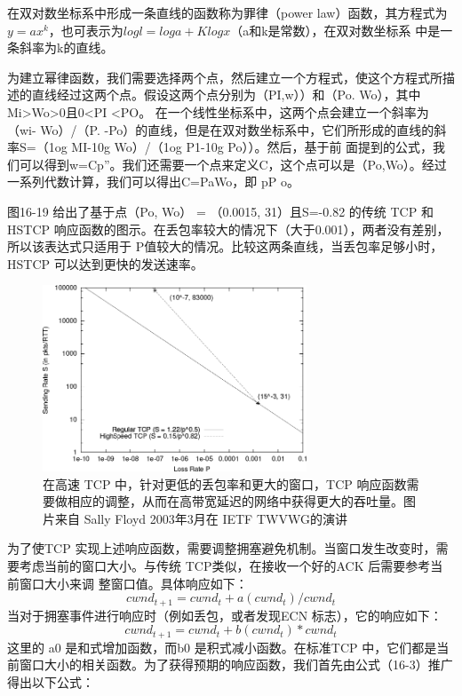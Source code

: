 \begin{tcolorbox}
    在双对数坐标系中形成一条直线的函数称为罪律（power law）函数，其方程式为$y=ax^{k}$，也可表示为$logl=loga+Klogx$（a和k是常数），在双对数坐标系
    中是一条斜率为k的直线。
\end{tcolorbox}

为建立幂律函数，我们需要选择两个点，然后建立一个方程式，使这个方程式所描述的直线经过这两个点。假设这两个点分别为（PI,w））和（Po. Wo），其中Mi>Wo>0且0<PI <PO。
在一个线性坐标系中，这两个点会建立一个斜率为（wi- Wo）/（P. -Po）的直线，但是在双对数坐标系中，它们所形成的直线的斜率S=（1og MI-10g Wo）/（1og P1-10g Po））。然后，基于前
面提到的公式，我们可以得到w=Cp”。我们还需要一个点来定义C，这个点可以是（Po,Wo）。经过一系列代数计算，我们可以得出C=PaWo，即 pP o。

图16-19 给出了基于点（Po, Wo） = （0.0015, 31）且S=-0.82 的传统 TCP 和 HSTCP 响应函数的图示。在丢包率较大的情况下（大于0.001），两者没有差别，所以该表达式只适用于
P值较大的情况。比较这两条直线，当丢包率足够小时，HSTCP 可以达到更快的发送速率。

\begin{figure}[!htb]
    \centering
	\includegraphics[width=0.7\textwidth]{imgs/16/16-19.png}
	\caption{在高速 TCP 中，针对更低的丢包率和更大的窗口，TCP 响应函数需要做相应的调整，从而在高带宽延迟的网络中获得更大的吞吐量。图片来自 Sally Floyd 2003年3月在 IETF TWVWG的演讲}
\end{figure}

为了使TCP 实现上述响应函数，需要调整拥塞避免机制。当窗口发生改变时，需要考虑当前的窗口大小。与传统 TCP类似，在接收一个好的ACK 后需要参考当前窗口大小来调
整窗口值。具体响应如下：
\begin{equation}
    cwnd_{t+1} = cwnd_{t} + a(cwnd_{t})/cwnd_{t}
\end{equation}
当对于拥塞事件进行响应时（例如丢包，或者发现ECN 标志），它的响应如下：
\begin{equation}
    cwnd_{t+1} = cwnd_{t} + b(cwnd_{t})*cwnd_{t}
\end{equation}
这里的 a0 是和式增加函数，而b0 是积式减小函数。在标准TCP 中，它们都是当前窗口大小的相关函数。为了获得预期的响应函数，我们首先由公式（16-3）推广得出以下公式：

